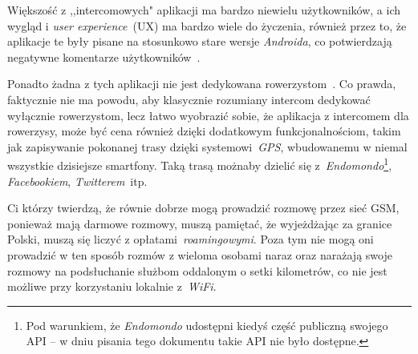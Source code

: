 \documentclass{article}
\begin{document}
Większość z ,,intercomowych" aplikacji ma bardzo niewielu użytkowników, a ich wygląd i \emph{user experience}~(UX) ma bardzo wiele do życzenia, również przez to, że aplikacje te były pisane na stosunkowo stare wersje \emph{Androida}, co potwierdzają negatywne komentarze użytkowników~\cite{www:existing-android-intercoms}.

Ponadto żadna z tych aplikacji nie jest dedykowana rowerzystom~\cite{www:best-existing-android-intercom}. Co prawda, faktycznie nie ma powodu, aby klasycznie rozumiany intercom dedykować wyłącznie rowerzystom, lecz łatwo wyobrazić sobie, że aplikacja z intercomem dla rowerzysy, może być cena również dzięki dodatkowym funkcjonalnościom, takim jak zapisywanie pokonanej trasy dzięki systemowi~\emph{GPS}, wbudowanemu w niemal wszystkie dzisiejsze smartfony. Taką trasą możnaby dzielić się z~\emph{Endomondo}\footnote{Pod warunkiem, że \emph{Endomondo} udostępni kiedyś część publiczną swojego API -- w dniu pisania tego dokumentu takie API nie było dostępne.}, \emph{Facebookiem}, \emph{Twitterem}~itp.

Ci którzy twierdzą, że równie dobrze mogą prowadzić rozmowę przez sieć GSM, ponieważ mają darmowe rozmowy, muszą pamiętać, że wyjeżdżając za granice Polski, muszą się liczyć z opłatami~\emph{roamingowymi}. Poza tym nie mogą oni prowadzić w ten sposób rozmów z wieloma osobami naraz oraz narażają swoje rozmowy na podsłuchanie służbom oddalonym o setki kilometrów, co nie jest możliwe przy korzystaniu lokalnie z~\emph{WiFi}.


\def\UrlBreaks{\do\/\do-}
\renewcommand\refname{Linki}


\end{document}
